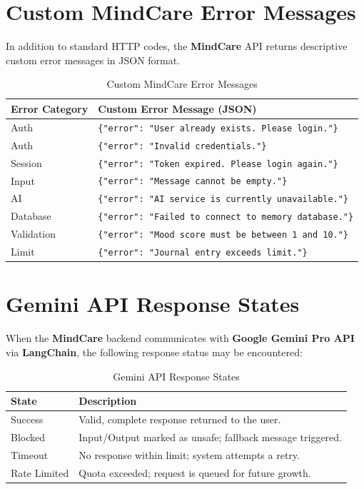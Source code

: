 \documentclass[a4paper,12pt]{report}
\begin{document}
\section{Custom MindCare Error Messages}
In addition to standard HTTP codes, the \textbf{MindCare} API returns descriptive custom error messages in JSON format.

\begin{table}[ht!]
    \centering
    \begin{tabular}{|l|p{8cm}|}
        \hline
        \textbf{Error Category} & \textbf{Custom Error Message (JSON)} \\ \hline
        Auth & \texttt{\{"error": "User already exists. Please login."\}} \\ \hline
        Auth & \texttt{\{"error": "Invalid credentials."\}} \\ \hline
        Session & \texttt{\{"error": "Token expired. Please login again."\}} \\ \hline
        Input & \texttt{\{"error": "Message cannot be empty."\}} \\ \hline
        AI & \texttt{\{"error": "AI service is currently unavailable."\}} \\ \hline
        Database & \texttt{\{"error": "Failed to connect to memory database."\}} \\ \hline
        Validation & \texttt{\{"error": "Mood score must be between 1 and 10."\}} \\ \hline
        Limit & \texttt{\{"error": "Journal entry exceeds limit."\}} \\ \hline
    \end{tabular}
    \caption{Custom MindCare Error Messages}
    \label{tab:error_messages}
\end{table}

\section{Gemini API Response States}
When the \textbf{MindCare} backend communicates with \textbf{Google Gemini Pro API} via \textbf{LangChain}, the following response status may be encountered:

\begin{table}[ht!]
    \centering
    \begin{tabular}{|l|p{10cm}|}
        \hline
        \textbf{State} & \textbf{Description} \\ \hline
        Success & Valid, complete response returned to the user. \\ \hline
        Blocked & Input/Output marked as unsafe; fallback message triggered. \\ \hline
        Timeout & No response within limit; system attempts a retry. \\ \hline
        Rate Limited & Quota exceeded; request is queued for future growth. \\ \hline
    \end{tabular}
    \caption{Gemini API Response States}
    \label{tab:gemini_states}
\end{table}
\end{document}
